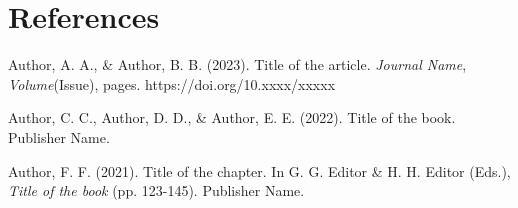 \documentclass[12pt,letterpaper]{article}
\begin{document}
\section{References}

\begin{thebibliography}{99}

Author, A. A., \& Author, B. B. (2023). Title of the article. \textit{Journal Name}, \textit{Volume}(Issue), pages. https://doi.org/10.xxxx/xxxxx

Author, C. C., Author, D. D., \& Author, E. E. (2022). Title of the book. Publisher Name.

Author, F. F. (2021). Title of the chapter. In G. G. Editor \& H. H. Editor (Eds.), \textit{Title of the book} (pp. 123-145). Publisher Name.

\end{thebibliography}

% 
% 


\end{document}
